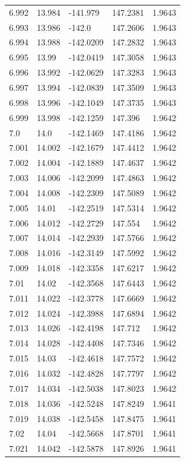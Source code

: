 \begin{tabular}{lllll}
6.992 & 13.984 & -141.979 & 147.2381 & 1.9643 \\
6.993 & 13.986 & -142.0 & 147.2606 & 1.9643 \\
6.994 & 13.988 & -142.0209 & 147.2832 & 1.9643 \\
6.995 & 13.99 & -142.0419 & 147.3058 & 1.9643 \\
6.996 & 13.992 & -142.0629 & 147.3283 & 1.9643 \\
6.997 & 13.994 & -142.0839 & 147.3509 & 1.9643 \\
6.998 & 13.996 & -142.1049 & 147.3735 & 1.9643 \\
6.999 & 13.998 & -142.1259 & 147.396 & 1.9642 \\
7.0 & 14.0 & -142.1469 & 147.4186 & 1.9642 \\
7.001 & 14.002 & -142.1679 & 147.4412 & 1.9642 \\
7.002 & 14.004 & -142.1889 & 147.4637 & 1.9642 \\
7.003 & 14.006 & -142.2099 & 147.4863 & 1.9642 \\
7.004 & 14.008 & -142.2309 & 147.5089 & 1.9642 \\
7.005 & 14.01 & -142.2519 & 147.5314 & 1.9642 \\
7.006 & 14.012 & -142.2729 & 147.554 & 1.9642 \\
7.007 & 14.014 & -142.2939 & 147.5766 & 1.9642 \\
7.008 & 14.016 & -142.3149 & 147.5992 & 1.9642 \\
7.009 & 14.018 & -142.3358 & 147.6217 & 1.9642 \\
7.01 & 14.02 & -142.3568 & 147.6443 & 1.9642 \\
7.011 & 14.022 & -142.3778 & 147.6669 & 1.9642 \\
7.012 & 14.024 & -142.3988 & 147.6894 & 1.9642 \\
7.013 & 14.026 & -142.4198 & 147.712 & 1.9642 \\
7.014 & 14.028 & -142.4408 & 147.7346 & 1.9642 \\
7.015 & 14.03 & -142.4618 & 147.7572 & 1.9642 \\
7.016 & 14.032 & -142.4828 & 147.7797 & 1.9642 \\
7.017 & 14.034 & -142.5038 & 147.8023 & 1.9642 \\
7.018 & 14.036 & -142.5248 & 147.8249 & 1.9641 \\
7.019 & 14.038 & -142.5458 & 147.8475 & 1.9641 \\
7.02 & 14.04 & -142.5668 & 147.8701 & 1.9641 \\
7.021 & 14.042 & -142.5878 & 147.8926 & 1.9641 \\

\end{tabular}
